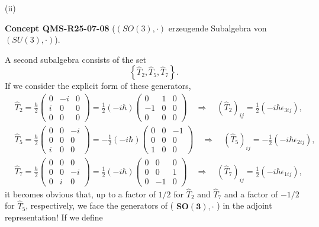 \documentclass[10pt, letterpaper]{article}
\newcommand{\CustomHeading}[3]{%
  \par\medskip\noindent%
  \textbf{#1 #2} \textnormal{(#3)}.\enskip%
}
\newenvironment{CONC}[2]{\begin{unitbox}\CustomHeading{Concept}{#1}{#2}}{\end{unitbox}}
\begin{document}
(ii) 


\begin{CONC}{QMS-R25-07-08}{$(S O(3), \cdot)$ erzeugende Subalgebra von $(S U(3), \cdot)$}
A second subalgebra consists of the set
$$
\left\{\hat{T}_{2}, \hat{T}_{5}, \hat{T}_{7}\right\} .
$$
If we consider the explicit form of these generators,
$$
\begin{aligned}
& \hat{T}_{2}=\frac{\hbar}{2}\left(\begin{array}{ccc}
0 & -i & 0 \\
i & 0 & 0 \\
0 & 0 & 0
\end{array}\right)=\frac{1}{2}(-i \hbar)\left(\begin{array}{ccc}
0 & 1 & 0 \\
-1 & 0 & 0 \\
0 & 0 & 0
\end{array}\right) \quad \Longrightarrow \quad\left(\hat{T}_{2}\right)_{i j}=\frac{1}{2}\left(-i \hbar \epsilon_{3 i j}\right), \\
& \hat{T}_{5}=\frac{\hbar}{2}\left(\begin{array}{ccc}
0 & 0 & -i \\
0 & 0 & 0 \\
i & 0 & 0
\end{array}\right)=-\frac{1}{2}(-i \hbar)\left(\begin{array}{ccc}
0 & 0 & -1 \\
0 & 0 & 0 \\
1 & 0 & 0
\end{array}\right) \quad \Longrightarrow \quad\left(\hat{T}_{5}\right)_{i j}=-\frac{1}{2}\left(-i \hbar \epsilon_{2 i j}\right), \\
& \hat{T}_{7}=\frac{\hbar}{2}\left(\begin{array}{ccc}
0 & 0 & 0 \\
0 & 0 & -i \\
0 & i & 0
\end{array}\right)=\frac{1}{2}(-i \hbar)\left(\begin{array}{ccc}
0 & 0 & 0 \\
0 & 0 & 1 \\
0 & -1 & 0
\end{array}\right) \quad \Longrightarrow \quad\left(\hat{T}_{7}\right)_{i j}=\frac{1}{2}\left(-i \hbar \epsilon_{1 i j}\right),
\end{aligned}
$$
it becomes obvious that, up to a factor of $1 / 2$ for $\hat{T}_{2}$ and $\hat{T}_{7}$ and a factor of $-1 / 2$ for $\hat{T}_{5}$, respectively, we face the generators of ( $\boldsymbol{S O}(\mathbf{3}), \cdot$ ) in the adjoint representation! If we define

\end{CONC}
\end{document}

